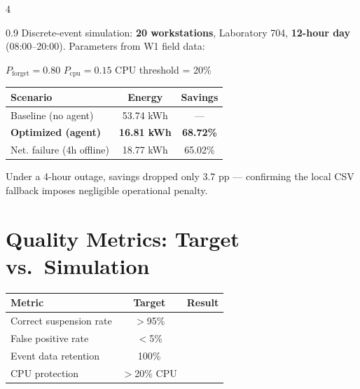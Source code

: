 \documentclass[a0,landscape]{a0poster}
\begin{document}
\begin{multicols}{4}
\begin{spacing}{0.9}
{\large Discrete-event simulation: \textbf{20 workstations}, Laboratory 704, \textbf{12-hour day} (08:00--20:00). Parameters from W1 field data:}

\vspace{0.2cm}
{\large $P_{\text{forget}} = 0.80$ \quad $P_{\text{cpu}} = 0.15$ \quad CPU threshold = 20\%}

\vspace{0.4cm}
\begin{center}
\begin{tcolorbox}[colback=ResultGreen, colframe=DarkGreen, boxrule=2pt, arc=5pt, left=0.5cm, right=0.5cm, top=0.4cm, bottom=0.4cm]
{\large
\begin{tabular}{@{}lcc@{}}
\toprule
\textbf{Scenario} & \textbf{Energy} & \textbf{Savings} \\
\midrule
Baseline (no agent) & 53.74 kWh & --- \\
\textbf{Optimized (agent)} & \textbf{16.81 kWh} & \textbf{68.72\%} \\
Net. failure (4h offline) & 18.77 kWh & 65.02\% \\
\bottomrule
\end{tabular}
}
\end{tcolorbox}
\end{center}

{\large Under a 4-hour outage, savings dropped only 3.7 pp — confirming the local CSV fallback imposes negligible operational penalty.}

\vspace{0.3cm}
\section*{Quality Metrics: Target vs.\ Simulation}

\begin{center}
{\large
\begin{tabular}{@{}p{5.5cm}cc@{}}
\toprule
\textbf{Metric} & \textbf{Target} & \textbf{Result} \\
\midrule
Correct suspension rate & $>$95\% & \color{DarkGreen}{97.2\% $\checkmark$} \\
False positive rate & $<$5\% & \color{DarkGreen}{2.8\% $\checkmark$} \\
Event data retention & 100\% & \color{DarkGreen}{100\% $\checkmark$} \\
CPU protection & $>$20\% CPU & \color{DarkGreen}{Detected $\checkmark$} \\
\bottomrule
\end{tabular}
}
\end{center}


\end{spacing}
\end{multicols}
\end{document}
